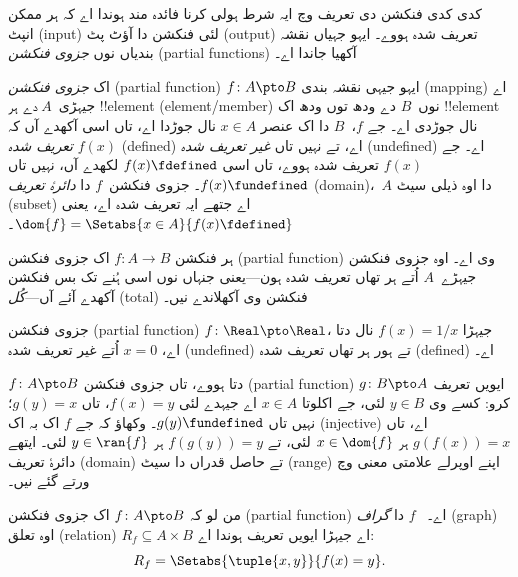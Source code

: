 \documentclass[../../../include/open-logic-section]{subfiles}
\begin{document}


\begin{explain}
کدی کدی فنکشن دی تعریف وچ ایہ شرط ہولی کرنا فائدہ مند ہوندا اے کہ
ہر ممکن انپٹ (input) لئی فنکشن دا آؤٹ پٹ (output) تعریف شدہ ہووے۔
ایہو جہیاں نقشہ بندیاں نوں \emph{جزوی فنکشن} (partial functions)
آکھیا جاندا اے۔
\end{explain}

\begin{defn}
اک \emph{جزوی فنکشن} (partial function) $f \colon A \pto B$ ایہو
جیہی نقشہ بندی (mapping) اے جیہڑی~$A$ دے ہر !!{element}
(element/member) نوں~$B$ دے ودھ توں ودھ اک !!{element} نال جوڑدی
اے۔ جے $f$،~$B$ دا اک عنصر $x \in A$ نال جوڑدا اے، تاں اسی آکھدے
آں کہ $f(x)$ \emph{تعریف شدہ} (defined) اے، تے نہیں تاں
\emph{غیر تعریف شدہ} (undefined) اے۔ جے $f(x)$ تعریف شدہ ہووے، تاں
اسی $f(x) \fdefined$ لکھدے آں، نہیں تاں $f(x) \fundefined$۔ جزوی
فنکشن~$f$ دا \emph{دائرۂ تعریف} (domain)،~$A$ دا اوہ ذیلی سیٹ
(subset) اے جتھے ایہ تعریف شدہ اے، یعنی
$\dom{f} = \Setabs{x \in A}{f(x) \fdefined}$۔
\end{defn}

\begin{ex}
ہر فنکشن $f\colon A \to B$ اک جزوی فنکشن (partial function) وی اے۔
اوہ جزوی فنکشن جیہڑے~$A$ اُتے ہر تھاں تعریف شدہ ہون---یعنی جنہاں
نوں اسی ہُنے تک بس فنکشن آکھدے آئے آں---\emph{کُل} (total) فنکشن
وی آکھلاندے نیں۔
\end{ex}

\begin{ex}
جزوی فنکشن (partial function) $f \colon \Real \pto \Real$، جیہڑا
$f(x) = 1/x$ نال دتا اے، $x = 0$ اُتے غیر تعریف شدہ (undefined) تے
ہور ہر تھاں تعریف شدہ (defined) اے۔
\end{ex}

\begin{prob}
$f\colon A \pto B$ دتا ہووے، تاں جزوی فنکشن (partial function)
$g\colon B \pto A$ ایویں تعریف کرو: کسے وی $y \in B$ لئی، جے
اکلوتا $x \in A$ اے جیہدے لئی $f(x) = y$، تاں $g(y) = x$؛ نہیں
تاں $g(y) \fundefined$۔ وکھاؤ کہ جے $f$ اک بہ اک (injective) اے،
تاں $g(f(x)) = x$ ہر $x \in \dom{f}$ لئی، تے $f(g(y)) = y$ ہر
$y \in \ran{f}$ لئی۔ ایتھے دائرۂ تعریف (domain) تے حاصل قدراں دا
سیٹ (range) اپنے اوپرلے علامتی معنی وچ ورتے گئے نیں۔
\end{prob}

\begin{defn}
من لو کہ $f\colon A \pto B$ اک جزوی فنکشن (partial function) اے۔
~$f$ دا \emph{گراف} (graph) اوہ تعلق (relation)
$R_f \subseteq A \times B$ اے جیہڑا ایویں تعریف ہوندا اے:
\[
R_f = \Setabs{\tuple{x,y}}{f(x) = y}.
\]
\end{defn}
\end{document}
